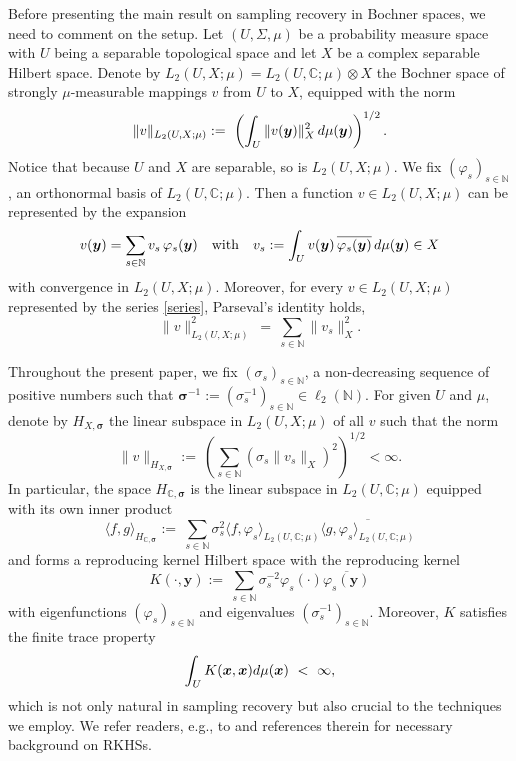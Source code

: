 \documentclass[11pt]{article}
\numberwithin{equation}{section}
\theoremstyle{definition}
\theoremstyle{remark}
\newcommand{\brac}[1]{\left(#1\right)}
\newcommand{\bx}{{\boldsymbol{x}}}
\newcommand{\by}{{\boldsymbol{y}}}
\newcommand{\bsigma}{{\boldsymbol{\sigma}}}
\newcommand{\rd}{{\rm d}}
\def\NN{{\mathbb N}}
\def\CC{{\mathbb C}}
\def\CC{{\mathbb C}}
\def\NN{{\mathbb N}}
\def\CC{{\mathbb C}}
\def\NN{{\mathbb N}}
\begin{document}
Before presenting the main result on sampling recovery in Bochner spaces, we need to comment on the {setup}.
Let $(U,\Sigma,\mu)$ be a probability measure space with $U$ being a separable topological space and let $X$ be a complex separable Hilbert space.
Denote by $L_2(U,X;\mu) = L_2(U,\CC;\mu) \otimes X$ the Bochner space of strongly $\mu$-measurable mappings $v$ from $U$ to $X$, equipped with the norm
\begin{equation} \nonumber
	\|v\|_{L_2(U,X;\mu)}
	:= \
	\left(\int_{U} \|v(\by)\|_X^2 \, \rd \mu(\by) \right)^{1/2}.
\end{equation}
Notice that because $U$ and $X$ are separable, so is $L_2(U,X;\mu)$.
We fix $\brac{\varphi_s}_{s \in \NN}$, an orthonormal basis of $L_2(U,\CC;\mu)$.
Then a function $v \in L_2(U,X;\mu)$ can be represented by the expansion
\begin{equation} \label{series}
	v(\by)=\sum_{s \in \NN} v_s \,\varphi_s(\by)
 \quad\text{with}\quad
	v_s:=\int_U v(\by)\,\overline{\varphi_s(\by)}\, \rd\mu (\by) \in X
\end{equation}
with convergence in $L_2(U,X;\mu)$.
Moreover, for every $v \in L_2(U,X;\mu)$ represented by the 
series \eqref{series}, Parseval's identity holds,
\begin{equation} \nonumber
	\|v\|_{L_2(U,X; \mu)}^2
	\ = \ \sum_{{s\in \NN}} \|v_s\|_X^2.
\end{equation}

Throughout the present paper, we fix $\brac{\sigma_s}_{s \in \NN}$, a non-decreasing sequence of positive numbers such that 
$\bsigma^{-1}:=\brac{\sigma_s^{-1}}_{s \in \NN} \in \ell_2(\NN)$.
For given $U$ and $\mu$, denote by $H_{X,\bsigma}$ the linear subspace in $L_2(U,X;\mu)$ of all $v$ such that the norm
\begin{equation} \nonumber
	\|v\|_{H_{X,\bsigma}}
	:= \
	\brac{\sum_{s \in \NN} \brac{\sigma_s \|v_s\|_X}^2}^{1/2} < \infty.		
\end{equation}
	In particular, the space $H_{\CC,\bsigma}$ is the linear subspace in $L_2(U,\CC;\mu)$ equipped with its own inner product
\begin{equation} \nonumber
	\langle f,g \rangle_{H_{\CC,\bsigma}}
	:= \
	\sum_{s \in \NN} \sigma_s^2 
	\langle f,\varphi_s \rangle_{L_2(U,\CC;\mu)}
	\overline{\langle g,\varphi_s \rangle_{L_2(U,\CC;\mu)}}
\end{equation}
and forms a reproducing kernel Hilbert space with the reproducing kernel
\begin{equation} \nonumber
	K(\cdot,\by)
	:= \
	\sum_{s \in \NN} \sigma_s^{-2} \varphi_s(\cdot)\overline{\varphi_s(\by)}
\end{equation}
with eigenfunctions $\brac{\varphi_s}_{s \in \NN}$ and eigenvalues 
$\brac{\sigma_s^{-1}}_{s \in \NN}$.
Moreover, $K$ satisfies the finite trace property
\begin{equation*}\label{trace assumption}
	\int_U K(\bx,\bx) \rd \mu(\bx) \ < \ \infty,
\end{equation*}
which is not only natural in sampling recovery but also crucial to the techniques we employ.  {We refer  readers, e.g.,  to \cite{BT2004,MU2021} and references therein for necessary background on RKHSs.}
\end{document}
